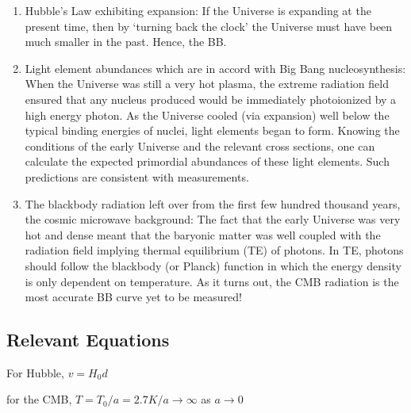 \documentclass[\main/main.tex]{subfiles}
\begin{document}
	\begin{enumerate}
	    \item Hubble's Law exhibiting expansion: If the Universe is expanding at the present time, then by `turning back the clock' the Universe must have been much smaller in the past. Hence, the BB.
	    \item Light element abundances which are in accord with Big Bang nucleosynthesis: When the Universe was still a very hot plasma, the extreme radiation field ensured that any nucleus produced would be immediately photoionized by a high energy photon. As the Universe cooled (via expansion) well below the typical binding energies of nuclei, light elements began to form. Knowing the conditions of the early Universe and the relevant cross sections, one can calculate the expected primordial abundances of these light elements. Such predictions are consistent with measurements.
	    \item The blackbody radiation left over from the first few hundred thousand years, the cosmic microwave background: The fact that the early Universe was very hot and dense meant that the baryonic matter was well coupled with the radiation field implying thermal equilibrium (TE) of photons. In TE, photons should follow the blackbody (or Planck) function in which the energy density is only dependent on temperature. As it turns out, the CMB radiation is the most accurate BB curve yet to be measured!
	\end{enumerate}


	\subsection{Relevant Equations} %
	\label{sub:relevant_equations}

	For Hubble, $v = H_0 d$

	for the CMB, $T = T_0 / a = 2.7 K / a \rightarrow \infty $ as $a \rightarrow 0$
	




	

	
\end{document}
